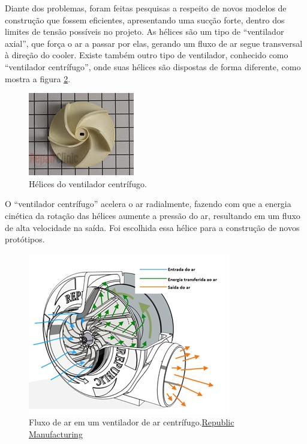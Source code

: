 		Diante dos problemas, foram feitas pesquisas a respeito de novos modelos de construção que fossem eficientes, apresentando uma sucção forte, dentro dos limites de tensão possíveis no projeto. As hélices são um tipo de “ventilador axial”, que força o ar a passar por elas, gerando um fluxo de ar segue transversal à direção do cooler. Existe também outro tipo de ventilador, conhecido como “ventilador centrífugo”, onde suas hélices são dispostas de forma diferente, como mostra a figura \ref{img:ventilador_centrífugo}.

		\begin{figure}[H]
			\centering
			\includegraphics[scale=1]{figuras/asppc2_5.jpg}
			\caption{Hélices do ventilador centrífugo.}
			\label{img:ventilador_centrífugo}
		\end{figure}

		O “ventilador centrífugo” acelera o ar radialmente, fazendo com que a energia cinética da rotação das hélices aumente a pressão do ar, resultando em um fluxo de alta velocidade na saída. Foi escolhida essa hélice para a construção de novos protótipos.

		\begin{figure}[H]
			\centering
			\includegraphics[scale=1]{figuras/asppc2_6.jpg}
			\caption{Fluxo de ar em um ventilador de ar centrífugo.\href{https://www.republic-mfg.com/blowers/republic-centrifugal-blower.asp}{Republic Manufacturing}}
			\label{img:ventilador_centrífugo}
		\end{figure}

